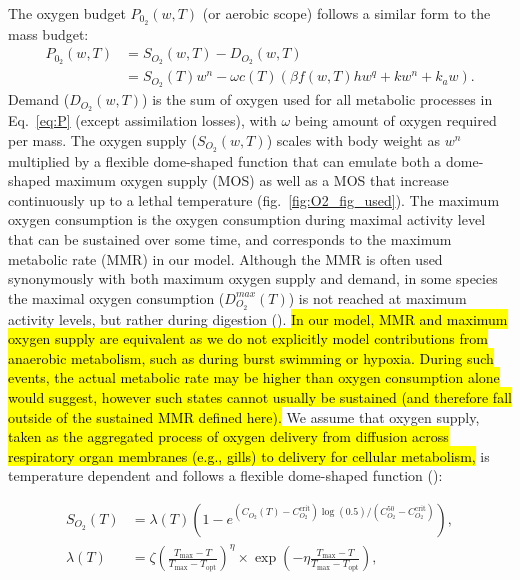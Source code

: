 \documentclass[11pt]{article}\usepackage[]{graphicx}\usepackage[]{color,soul}
\begin{document}
The oxygen budget $P_{0_2}(w,T)$ (or aerobic scope) follows a similar form to the mass budget:
\begin{align}
  P_{0_2}(w,T) &= S_{O_2}(w,T) - D_{O_2}(w,T) \\
        &= S_{O_2}(T) w^n - \omega c(T) \left( \beta f(w,T) h w^q + k w^n + k_a w \right).
\end{align}
Demand ($D_{O_2}(w,T)$) is the sum of oxygen used for all metabolic processes in Eq.~\ref{eq:P} (except assimilation losses), with $\omega$ being amount of oxygen required per mass.  The oxygen supply ($S_{O_2}(w,T)$) scales with body weight as $w^n$ multiplied by a flexible dome-shaped function that can emulate both a dome-shaped maximum oxygen supply (MOS) as well as a MOS that increase continuously up to a lethal temperature (fig.~\ref{fig:O2_fig_used}). The maximum oxygen consumption is the oxygen consumption during maximal activity level that can be sustained over some time, and corresponds to the maximum metabolic rate (MMR) in our model. Although the MMR is often used synonymously with both maximum oxygen supply and demand, in some species the maximal oxygen consumption ($D^{max}_{O_2}(T)$) is not reached at maximum activity levels, but rather during digestion (\citealt{priede_metabolic_1985}). \hl{ In our model, MMR and maximum oxygen supply are equivalent as we do not explicitly model contributions from anaerobic metabolism, such as during burst swimming or hypoxia. During such events, the actual metabolic rate may be higher than oxygen consumption alone would suggest, however such states cannot usually be sustained (and therefore fall outside of the sustained MMR defined here).} We assume that oxygen supply, \hl{taken as the aggregated process of oxygen delivery from diffusion across respiratory organ membranes (e.g., gills) to delivery for cellular metabolism,} is temperature dependent and follows a flexible dome-shaped function (\citealt{gnauck_2013_freshwater, lefrancois_influence_2003}):

\begin{align}
S_{O_2}(T)&=\lambda(T)\left(1-e^{(C_{O_2}(T)-C_{O_2}^{\text{crit}})\log(0.5)/(C_{O_2}^\text{50}-C_{O_2}^{\text{crit}})}\right),\\
\lambda(T)&=\zeta\left(\frac{T_{\text{max}}-T}{T_{\text{max}}-T_{\text{opt}}}\right)^\eta \times \exp\left(-\eta\frac{T_{\text{max}}-T}{T_{\text{max}}-T_{\text{opt}}}\right),
\end{align}
\end{document}

